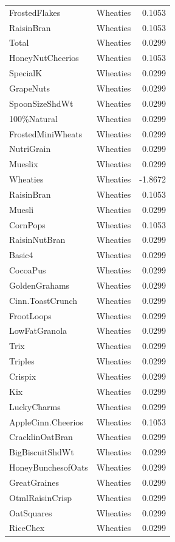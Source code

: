 \begin{longtable}{llr}
FrostedFlakes & Wheaties & 0.1053 \\
RaisinBran & Wheaties & 0.1053 \\
Total & Wheaties & 0.0299 \\
HoneyNutCheerios & Wheaties & 0.1053 \\
SpecialK & Wheaties & 0.0299 \\
GrapeNuts & Wheaties & 0.0299 \\
SpoonSizeShdWt & Wheaties & 0.0299 \\
100\%Natural & Wheaties & 0.0299 \\
FrostedMiniWheats & Wheaties & 0.0299 \\
NutriGrain & Wheaties & 0.0299 \\
Mueslix & Wheaties & 0.0299 \\
Wheaties & Wheaties & -1.8672 \\
RaisinBran & Wheaties & 0.1053 \\
Muesli & Wheaties & 0.0299 \\
CornPops & Wheaties & 0.1053 \\
RaisinNutBran & Wheaties & 0.0299 \\
Basic4 & Wheaties & 0.0299 \\
CocoaPus & Wheaties & 0.0299 \\
GoldenGrahams & Wheaties & 0.0299 \\
Cinn.ToastCrunch & Wheaties & 0.0299 \\
FrootLoops & Wheaties & 0.0299 \\
LowFatGranola & Wheaties & 0.0299 \\
Trix & Wheaties & 0.0299 \\
Triples & Wheaties & 0.0299 \\
Crispix & Wheaties & 0.0299 \\
Kix & Wheaties & 0.0299 \\
LuckyCharms & Wheaties & 0.0299 \\
AppleCinn.Cheerios & Wheaties & 0.1053 \\
CracklinOatBran & Wheaties & 0.0299 \\
BigBiscuitShdWt & Wheaties & 0.0299 \\
HoneyBunchesofOats & Wheaties & 0.0299 \\
GreatGraines & Wheaties & 0.0299 \\
OtmlRaisinCrisp & Wheaties & 0.0299 \\
OatSquares & Wheaties & 0.0299 \\
RiceChex & Wheaties & 0.0299 \\

\end{longtable}
